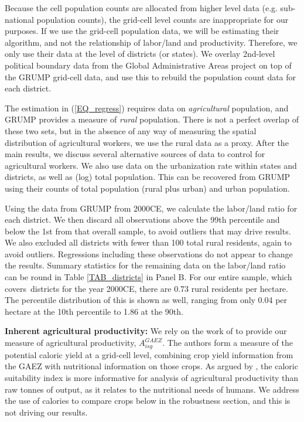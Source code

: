 \documentclass[11pt]{article}
\begin{document}
Because the cell population counts are allocated from higher level data (e.g. sub-national population counts), the grid-cell level counts are inappropriate for our purposes. If we use the grid-cell population data, we will be estimating their algorithm, and not the relationship of labor/land and productivity. Therefore, we only use their data at the level of districts (or states). We overlay 2nd-level political boundary data from the Global Administrative Areas project \citep{gadm} on top of the GRUMP grid-cell data, and use this to rebuild the population count data for each district.

The estimation in (\ref{EQ_regress}) requires data on \textit{agricultural} population, and GRUMP provides a measure of \textit{rural} population. There is not a perfect overlap of these two sets, but in the absence of any way of measuring the spatial distribution of agricultural workers, we use the rural data as a proxy. After the main results, we discuss several alternative sources of data to control for agricultural workers. We also use data on the urbanization rate within states and districts, as well as (log) total population. This can be recovered from GRUMP using their counts of total population (rural plus urban) and urban population.

Using the data from GRUMP from 2000CE, we calculate the labor/land ratio for each district. We then discard all observations above the 99th percentile and below the 1st from that overall sample, to avoid outliers that may drive results. We also excluded all districts with fewer than 100 total rural residents, again to avoid outliers. Regressions including these observations do not appear to change the results. Summary statistics for the remaining data on the labor/land ratio can be round in Table \ref{TAB_districts} in Panel B. For our entire sample, which covers\districts \ districts for the year 2000CE, there are 0.73 rural residents per hectare. The percentile distribution of this is shown as well, ranging from only 0.04 per hectare at the 10th percentile to 1.86 at the 90th. 

\vspace{.5cm}\noindent\textbf{Inherent agricultural productivity:} We rely on the work of \citet{galorozak2016} to provide our measure of agricultural productivity, $A^{GAEZ}_{isg}$. The authors form a measure of the potential caloric yield at a grid-cell level, combining crop yield information from the GAEZ with nutritional information on those crops. As argued by \citet{galorozak2016}, the caloric suitability index is more informative for analysis of agricultural productivity than raw tonnes of output, as it relates to the nutritional needs of humans. We address the use of calories to compare crops below in the robustness section, and this is not driving our results.
\end{document}
